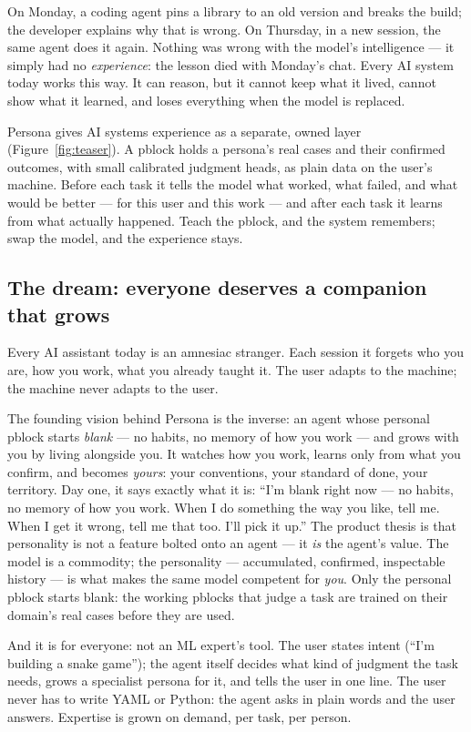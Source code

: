 \documentclass[11pt]{article}
\begin{document}
On Monday, a coding agent pins a library to an old version and breaks the build; the developer explains why that is wrong. On Thursday, in a new session, the same agent does it again. Nothing was wrong with the model's intelligence --- it simply had no \emph{experience}: the lesson died with Monday's chat. Every AI system today works this way. It can reason, but it cannot keep what it lived, cannot show what it learned, and loses everything when the model is replaced.

Persona gives AI systems experience as a separate, owned layer (Figure~\ref{fig:teaser}). A pblock holds a persona's real cases and their confirmed outcomes, with small calibrated judgment heads, as plain data on the user's machine. Before each task it tells the model what worked, what failed, and what would be better --- for this user and this work --- and after each task it learns from what actually happened. Teach the pblock, and the system remembers; swap the model, and the experience stays.

\subsection{The dream: everyone deserves a companion that grows}

Every AI assistant today is an amnesiac stranger. Each session it forgets who you are, how you work, what you already taught it. The user adapts to the machine; the machine never adapts to the user.

The founding vision behind Persona is the inverse: an agent whose personal pblock starts \emph{blank} --- no habits, no memory of how you work --- and grows with you by living alongside you. It watches how you work, learns only from what you confirm, and becomes \emph{yours}: your conventions, your standard of done, your territory. Day one, it says exactly what it is: ``I'm blank right now --- no habits, no memory of how you work. When I do something the way you like, tell me. When I get it wrong, tell me that too. I'll pick it up.'' The product thesis is that personality is not a feature bolted onto an agent --- it \emph{is} the agent's value. The model is a commodity; the personality --- accumulated, confirmed, inspectable history --- is what makes the same model competent for \emph{you}. Only the personal pblock starts blank: the working pblocks that judge a task are trained on their domain's real cases before they are used.

And it is for everyone: not an ML expert's tool. The user states intent (``I'm building a snake game''); the agent itself decides what kind of judgment the task needs, grows a specialist persona for it, and tells the user in one line. The user never has to write YAML or Python: the agent asks in plain words and the user answers. Expertise is grown on demand, per task, per person.
\end{document}
